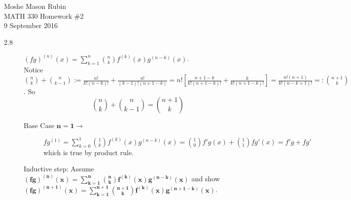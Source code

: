 \documentclass{article}
\begin{document}
	\begin{flushright}
		Moshe Mason Rubin\\MATH 330 Homework \#2\\9 September 2016
	\end{flushright}
	\begin{description}
		\item[2.8] $\left(fg\right)^{\left(n\right)}\left(x\right)=\displaystyle\sum_{k=1}^n\binom{n}{k}f^{\left(k\right)}(x)g^{\left(n-k\right)}\left(x\right)$.\\
		Notice $\binom{n}{k}+\binom{n}{k-1}:=\frac{n!}{k!\left(n-k\right)!}+\frac{n!}{\left(k-1\right)!\left(n+1-k\right)}=n!\left[\frac{n+1-k}{k!\left(n+1-k\right)!}+\frac{k}{k!\left(n+1-k\right)!}\right]=\frac{n!\left(n+1\right)}{k!\left(n-k+1\right)!}=:\binom{n+1}{k}$. So \begin{equation}\label{eq1}
		\binom{n}{k}+\binom{n}{k-1}=\binom{n+1}{k}
		\end{equation}
		\begin{description}
			\item[Base Case $\mathbf{n=1}\to$] $fg^{\left(1\right)}=\displaystyle\sum_{k=0}^1\binom{1}{k}f^{\left(k\right)}\left(x\right)g^{\left(n-k\right)}(x)=\binom{1}{0}f'g\left(x\right)+\binom{1}{1}fg'\left(x\right)=f'g+fg'$ which is true by product rule. \checkmark
			\item[Inductive step: Assume $\mathbf{\left(fg\right)^{\left(n\right)}\left(x\right)=\displaystyle\sum_{k=1}^n\binom{n}{k}f^{\left(k\right)}(x)g^{\left(n-k\right)}\left(x\right)}$ and show $\mathbf{\left(fg\right)^{\left(n+1\right)}\left(x\right)=\displaystyle\sum_{k=1}^{n+1}\binom{n+1}{k}f^{\left(k\right)}(x)g^{\left(n+1-k\right)}\left(x\right)}$.]
			\begin{dmath*}

\end{dmath*}
\end{description}
\end{description}
\end{document}
